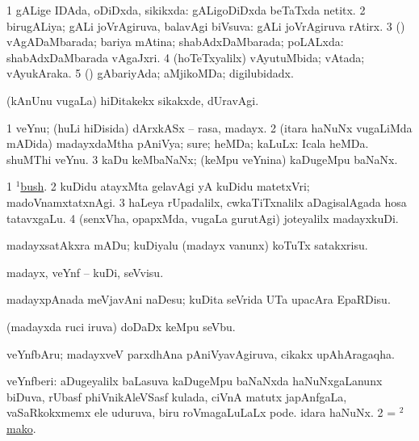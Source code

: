 \bentry 
{}
\gl{\gu} 
\bmng
\bnum
\num{1} gALige IDAda, oDiDxda, sikikxda:  gALigoDiDxda beTaTxda netitx. 
\num{2} birugALiya; gALi joVrAgiruva, balavAgi biVsuva:  gALi joVrAgiruva rAtirx. 
\num{3} (\AmA) vAgADaMbarada; bariya mAtina; shabAdxDaMbarada; poLALxda:  shabAdxDaMbarada vAgaJxri. 
\num{4} (hoTeTxyalilx) vAyutuMbida; vAtada; vAyukAraka. 
\num{5} (\AmA) gAbariyAda; aMjikoMDa; digilubidadx. 
\enum
\emng

\noindent
\gl{\pagu}
\bmng
{} (kAnUnu \mo vugaLa) hiDitakekx sikakxde, dUravAgi. 
\emng
\eentry

\bentry
{} 
\gl{\nA}
\expl{}
\bmng
\bnum
\num{1} veYnu; (huLi hiDisida) dArxkASx -- rasa, madayx. 
\num{2} (itara haNuNx \mo vugaLiMda mADida) madayxdaMtha pAniVya; sure; heMDa; kaLuLx:  Icala heMDa.  shuMThi veYnu. 
\num{3} kaDu keMbaNaNx; (keMpu veYnina) kaDugeMpu baNaNx. 
\enum
\emng

\noindent
\gl{\pagu}
\bmng
\bnum
\num{1}  \hyperref{kandict_b.pdf}{B}{bush(1) nuga(3)}{$^1$bush}. 
\num{2}  kuDidu atayxMta gelavAgi yA kuDidu matetxVri; madoVnamxtatxnAgi. 
\num{3}  haLeya rUpadalilx, cwkaTiTxnalilx aDagisalAgada hosa tatavxgaLu. 
\num{4}  (senxVha, opapxMda, \mo vugaLa gurutAgi) joteyalilx madayxkuDi. 
\enum
\emng
\eentry

\bentry
{}
\gl{\sakirx}
\expl{}
\bmng
madayxsatAkxra mADu; kuDiyalu (madayx \mo vanunx) koTuTx satakxrisu. 
\emng

\noindent 
\gl{\akirx}
\expl{}
\bmng
madayx, veYnf -- kuDi, seVvisu. 
\emng

\noindent 
\gl{\pagu}
\bmng
{} madayxpAnada meVjavAni naDesu; kuDita seVrida UTa upacAra EpaRDisu. 
\emng
\eentry

\bentry 
{}
\gl{\nA}
\bmng
(madayxda ruci iruva) doDaDx keMpu seVbu. 
\emng
\eentry

\bentry
{}
\gl{\nA}
\bmng
veYnfbAru; madayxveV parxdhAna pAniVyavAgiruva, cikakx upAhAragaqha. 
\emng
\eentry

\bentry
{}
\gl{\nA} 
\bmng
\bnum
{} veYnfberi: 
\banum
{} aDugeyalilx baLasuva kaDugeMpu baNaNxda haNuNxgaLanunx biDuva, rUbasf phiVnikAleVSasf kulada, ciVnA matutx japAnfgaLa, vaSaRkokxmemx ele uduruva, biru roVmagaLuLaLx pode. 
 idara haNuNx. 
\eanum
\numie
\num{2} = \hyperref{kandict_m.pdf}{M}{mako(2)}{$^2$mako}. 
\enum
\emng
\eentry

